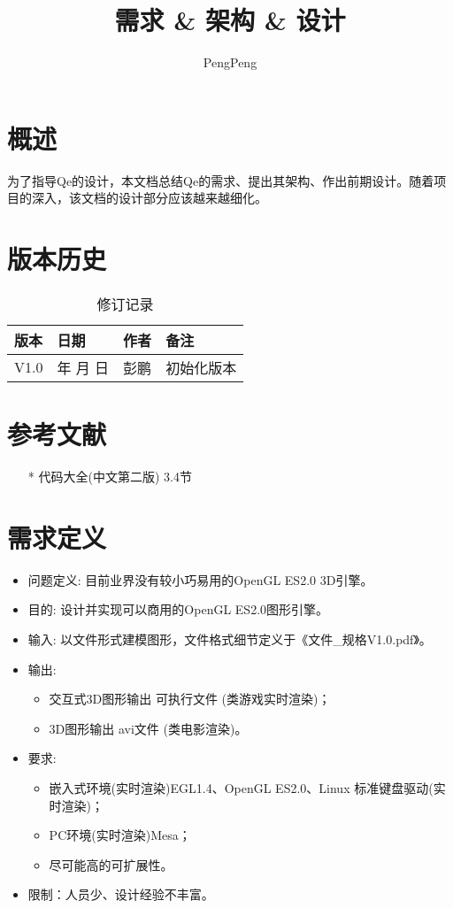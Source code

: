 \documentclass[12pt,a4paper]{report}
\title{需求 \& 架构 \& 设计}
\author{PengPeng}
\renewcommand{\today}{\number\year 年 \number\month 月 \number\day 日}
\begin{document}
\maketitle
\tableofcontents
\newpage

\chapter{概述}
为了指导Qe的设计，本文档总结Qe的需求、提出其架构、作出前期设计。随着项目的深入，该文档的设计部分应该越来越细化。
\newpage

\chapter{版本历史}
\begin{table}[!hbp]
\begin{center}
	\begin{tabular}{|l|l|l|l|}
		\hline
		版本 & 日期 & 作者 & 备注 \\
		\hline
		V1.0 & \today & 彭鹏 & 初始化版本 \\
		\hline
	\end{tabular}
	\caption{修订记录}
\end{center}
\end{table} 
\newpage

\chapter{参考文献}
\begin{enumerate}
	\item[*] 代码大全(中文第二版) 3.4节
\end{enumerate}
\newpage

\chapter{需求定义}
\begin{itemize}
	\item 问题定义: 目前业界没有较小巧易用的OpenGL ES2.0  3D引擎。
	\item 目的: 设计并实现可以商用的OpenGL ES2.0图形引擎。
	\item 输入: 以文件形式建模图形，文件格式细节定义于《文件\_规格V1.0.pdf》。
	\item 输出:
		\begin{itemize}
			\item 交互式3D图形输出 可执行文件 (类游戏实时渲染)；
			\item 3D图形输出 avi文件 (类电影渲染)。
		\end{itemize}
	\item 要求:
		\begin{itemize}
			\item 嵌入式环境(实时渲染)EGL1.4、OpenGL ES2.0、Linux 标准键盘驱动(实时渲染)；
			\item PC环境(实时渲染)Mesa；
			\item 尽可能高的可扩展性。
		\end{itemize}
	\item 限制：人员少、设计经验不丰富。
\end{itemize}
 
\end{document}
